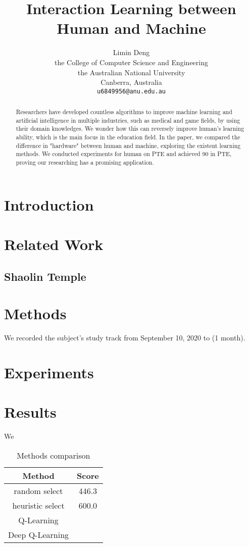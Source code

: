 \documentclass{article}
\title{Interaction Learning between Human and Machine}
\author{%
Limin Deng \\
the College of Computer Science and Engineering\\
 the Australian National University\\
  Canberra, Australia\\
  \texttt{u6849956@anu.edu.au} \\
}
\begin{document}
\maketitle

\begin{abstract}
Researchers have developed countless algorithms to improve machine learning and artificial intelligence in multiple industries, such as medical and game fields, by using their domain knowledges. We wonder how this can reversely improve human's learning ability, which is the main focus in the education field. In the paper, we compared the difference in "hardware" between human and machine, exploring the existent learning methods. We conducted experiments for human on PTE and achieved 90 in PTE, proving our researching has a promising application.
\end{abstract}



\section{Introduction}


\section{Related Work}

\subsection{Shaolin Temple}



\section{Methods}

We recorded the subject's study track from September 10, 2020 to (1 month). 


\section{Experiments}


\section{Results}

We 
\begin{table}[!htp]
\centering
\begin{tabular}{c|c}
\toprule
Method & Score \\
\toprule
random select & 446.3 \\
\hline
heuristic select & 600.0 \\
\hline
Q-Learning & \\
\hline
Deep Q-Learning & \\
\bottomrule
\end{tabular}
\caption{Methods comparison}
\label{tab:methods}
\end{table}





\end{document}

